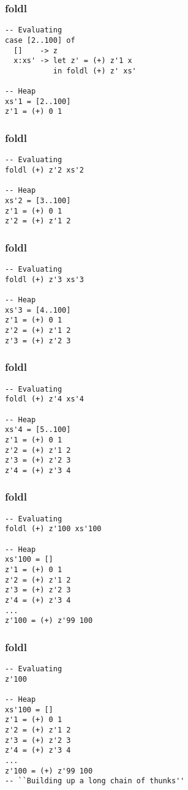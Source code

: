\documentclass{beamer}
\begin{document}
\begin{frame}[t,fragile]
\frametitle{foldl}
\begin{verbatim}
-- Evaluating
case [2..100] of
  []    -> z
  x:xs' -> let z' = (+) z'1 x
           in foldl (+) z' xs'

-- Heap
xs'1 = [2..100]
z'1 = (+) 0 1
\end{verbatim}
\end{frame}

\begin{frame}[t,fragile]
\frametitle{foldl}
\begin{verbatim}
-- Evaluating
foldl (+) z'2 xs'2

-- Heap
xs'2 = [3..100]
z'1 = (+) 0 1
z'2 = (+) z'1 2
\end{verbatim}
\end{frame}

\begin{frame}[t,fragile]
\frametitle{foldl}
\begin{verbatim}
-- Evaluating
foldl (+) z'3 xs'3

-- Heap
xs'3 = [4..100]
z'1 = (+) 0 1
z'2 = (+) z'1 2
z'3 = (+) z'2 3
\end{verbatim}
\end{frame}

\begin{frame}[t,fragile]
\frametitle{foldl}
\begin{verbatim}
-- Evaluating
foldl (+) z'4 xs'4

-- Heap
xs'4 = [5..100]
z'1 = (+) 0 1
z'2 = (+) z'1 2
z'3 = (+) z'2 3
z'4 = (+) z'3 4
\end{verbatim}
\end{frame}

\begin{frame}[t,fragile]
\frametitle{foldl}
\begin{verbatim}
-- Evaluating
foldl (+) z'100 xs'100

-- Heap
xs'100 = []
z'1 = (+) 0 1
z'2 = (+) z'1 2
z'3 = (+) z'2 3
z'4 = (+) z'3 4
...
z'100 = (+) z'99 100
\end{verbatim}
\end{frame}

\begin{frame}[t,fragile]
\frametitle{foldl}
\begin{verbatim}
-- Evaluating
z'100

-- Heap
xs'100 = []
z'1 = (+) 0 1
z'2 = (+) z'1 2
z'3 = (+) z'2 3
z'4 = (+) z'3 4
...
z'100 = (+) z'99 100
-- ``Building up a long chain of thunks''
\end{verbatim}
\end{frame}
\end{document}
